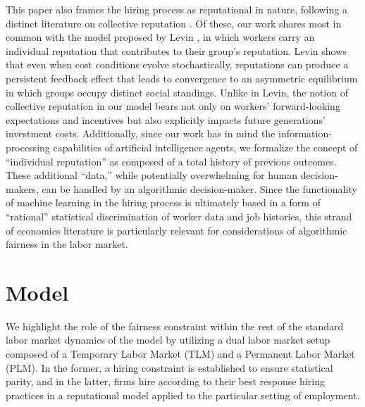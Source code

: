 \documentclass[sigconf]{acmart}
\theoremstyle{definition}
\begin{document}

This paper also frames the hiring process as reputational in nature, following a distinct literature on collective reputation \cite{tirole1996theory,winfree2005collective}. Of these, our work shares most in common with the model proposed by Levin \cite{levin2009dynamics}, in which workers carry an individual reputation that contributes to their group's reputation. Levin shows that even when cost conditions evolve stochastically, reputations can produce a persistent feedback effect that leads to convergence to an asymmetric equilibrium in which groups occupy distinct social standings. Unlike in Levin, the notion of collective reputation in our model bears not only on workers' forward-looking expectations and incentives but also explicitly impacts future generations' investment costs. Additionally, since our work has in mind the information-processing capabilities of artificial intelligence agents, we formalize the concept of ``individual reputation'' as composed of a total history of previous outcomes. These additional ``data,'' while potentially overwhelming for human decision-makers, can be handled by an algorithmic decision-maker. Since the functionality of machine learning in the hiring process is ultimately based in a form of ``rational'' statistical discrimination of worker data and job histories, this strand of economics literature is particularly relevant for considerations of algorithmic fairness in the labor market.

\section{Model}
We highlight the role of the fairness constraint within the rest of the standard labor market dynamics of the model by utilizing a dual labor market setup composed of a Temporary Labor Market (TLM) and a Permanent Labor Market (PLM). In the former, a hiring constraint is established to ensure statistical parity, and in the latter, firms hire according to their best response hiring practices in a reputational model applied to the particular setting of employment. 
 
\end{document}
